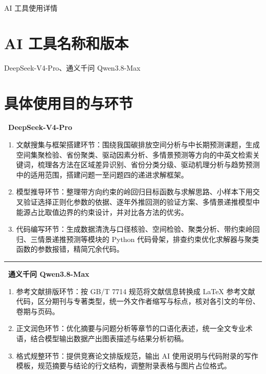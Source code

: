 \documentclass[12pt,a4paper]{ctexart}
\begin{document}
\begin{center}
{\heiti AI 工具使用详情}
\end{center}

\section{AI 工具名称和版本}

DeepSeek-V4-Pro、通义千问 Qwen3.8-Max

\section{具体使用目的与环节}

\noindent\textbf{\textbullet~DeepSeek-V4-Pro}

\begin{enumerate}[label=\arabic*.]
  \item 文献搜集与框架搭建环节：围绕我国碳排放空间分析与中长期预测课题，生成空间集聚检验、省份聚类、驱动因素分析、多情景预测等方向的中英文检索关键词，梳理各方法在区域差异识别、省份分类分级、驱动机理分析与趋势预测中的适用范围，搭建问题一至问题四的递进求解框架。
  \item 模型推导环节：整理带方向约束的岭回归目标函数与求解思路、小样本下用交叉验证选择正则化参数的依据、逐年外推回测的验证方案、多情景递推模型中能源占比取值边界的约束设计，并对比各方法的优劣。
  \item 代码编写环节：生成数据清洗与口径核验、空间检验、聚类分析、带约束岭回归、三情景递推预测等模块的 Python 代码骨架，排查约束优化求解器与聚类函数的参数报错，精简冗余代码。
\end{enumerate}

\noindent\rule{\linewidth}{0.4pt}

\noindent\textbf{\textbullet~通义千问 Qwen3.8-Max}

\begin{enumerate}[label=\arabic*.]
  \item 参考文献排版环节：按 GB/T 7714 规范将文献信息转换成 LaTeX 参考文献代码，区分期刊与专著类型，统一外文作者缩写与标点，核对各引文的年份、卷期与页码。
  \item 正文润色环节：优化摘要与问题分析等章节的口语化表述，统一全文专业术语，结合模型输出数据产出图表描述与结果分析初稿。
  \item 格式规整环节：提供竞赛论文排版规范，输出 AI 使用说明与代码附录的写作模板，规范摘要与结论的行文结构，调整附录表格与图片占位格式。
\end{enumerate}
\end{document}
